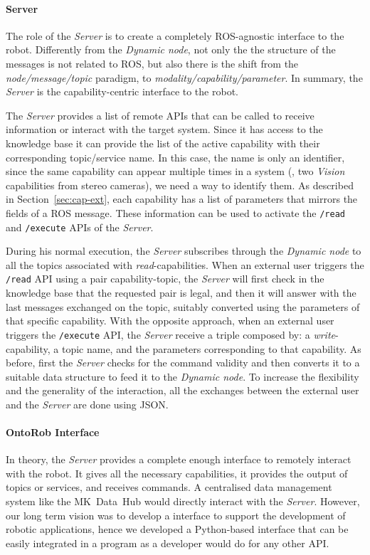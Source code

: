 \paragraph{Server} The role of the \textit{Server} is to create a completely ROS-agnostic interface to the robot. Differently from the \textit{Dynamic node}, not only the the structure of the messages is not related to ROS, but also there is the shift from the \textit{node/message/topic} paradigm, to \textit{modality/capability/parameter}. In summary, the \textit{Server} is the capability-centric interface to the robot.

The \textit{Server} provides a list of remote APIs that can be called to receive information or interact with the target system. Since it has access to the knowledge base it can provide the list of the active capability with their corresponding topic/service name. In this case, the name is only an identifier, since the same capability can appear multiple times in a system (\eg, two \textit{Vision} capabilities from stereo cameras), we need a way to identify them. As described in Section~\ref{sec:cap-ext}, each capability has a list of parameters that mirrors the fields of a ROS message. These information can be used to activate the \texttt{/read} and \texttt{/execute} APIs of the \textit{Server}.

During his normal execution, the \textit{Server} subscribes through the \textit{Dynamic node} to all the topics associated with \textit{read}-capabilities. When an external user triggers the \texttt{/read} API using a pair capability-topic, the \textit{Server} will first check in the knowledge base that the requested pair is legal, and then it will answer with the last messages exchanged on the topic, suitably converted using the parameters of that specific capability. With the opposite approach, when an external user triggers the \texttt{/execute} API, the \textit{Server} receive a triple composed by: a \textit{write}-capability, a topic name, and the parameters corresponding to that capability. As before, first the \textit{Server} checks for the command validity and then converts it to a suitable data structure to feed it to the \textit{Dynamic node}. To increase the flexibility and the generality of the interaction, all the exchanges between the external user and the \textit{Server} are done using JSON.

\paragraph{OntoRob Interface} In theory, the \textit{Server} provides a complete enough interface to remotely interact with the robot. It gives all the necessary capabilities, it provides the output of topics or services, and receives commands. A centralised data management system like the MK~Data~Hub would directly interact with the \textit{Server}. However, our long term vision was to develop a interface to support the development of robotic applications, hence we developed a Python-based interface that can be easily integrated in a program as a developer would do for any other API.

